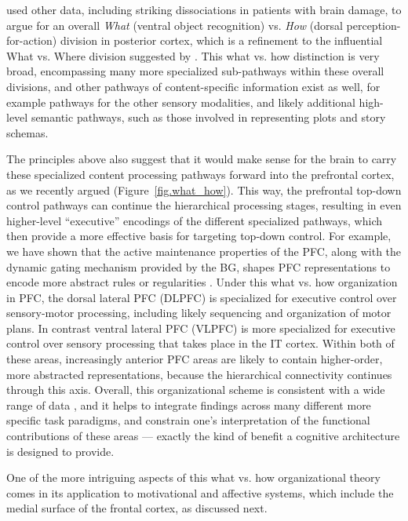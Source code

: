 \documentclass[11pt,twoside]{article}
\begin{document}
 used other data, including striking
dissociations in patients with brain damage, to argue for an overall
{\em What} (ventral object recognition) vs. {\em How} (dorsal
perception-for-action) division in posterior cortex, which is a
refinement to the influential What vs. Where division suggested by
.  This what vs. how distinction is very
broad, encompassing many more specialized sub-pathways within these
overall divisions, and other pathways of content-specific information
exist as well, for example pathways for the other sensory modalities,
and likely additional high-level semantic pathways, such as those
involved in representing plots and story schemas.

The principles above also suggest that it would make sense for the
brain to carry these specialized content processing pathways forward
into the prefrontal cortex, as we recently argued \cite{OReilly10}
(Figure~\ref{fig.what_how}).  This way, the prefrontal top-down
control pathways can continue the hierarchical processing stages,
resulting in even higher-level ``executive'' encodings of the
different specialized pathways, which then provide a more effective
basis for targeting top-down control.  For example, we have shown that
the active maintenance properties of the PFC, along with the dynamic
gating mechanism provided by the BG, shapes PFC representations to
encode more abstract rules or regularities \cite{RougierEtAl}.  Under
this what vs. how organization in PFC, the dorsal lateral PFC (DLPFC)
is specialized for executive control over sensory-motor processing,
including likely sequencing and organization of motor plans.  In
contrast ventral lateral PFC (VLPFC) is more specialized for executive
control over sensory processing that takes place in the IT cortex.
Within both of these areas, increasingly anterior PFC areas are likely
to contain higher-order, more abstracted representations, because the
hierarchical connectivity continues through this axis.  Overall, this
organizational scheme is consistent with a wide range of data
\cite{OReilly10}, and it helps to integrate findings across many
different more specific task paradigms, and constrain one's
interpretation of the functional contributions of these areas ---
exactly the kind of benefit a cognitive architecture is designed to
provide.

One of the more intriguing aspects of this what vs. how organizational
theory comes in its application to motivational and affective systems,
which include the medial surface of the frontal cortex, as discussed
next.
\end{document}
